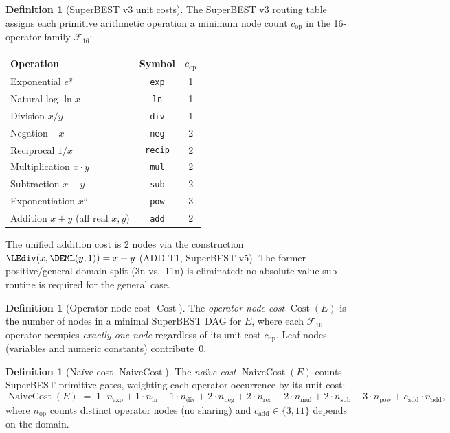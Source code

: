 \documentclass[12pt,a4paper]{article}
\theoremstyle{definition}
\newtheorem{definition}[theorem]{Definition}
\newcommand{\Cost}{\operatorname{Cost}}
\newcommand{\NC}{\operatorname{NaiveCost}}
\begin{document}
\begin{definition}[SuperBEST v3 unit costs]
\label{def:unit-costs}
The SuperBEST v3 routing table assigns each primitive arithmetic operation a
minimum node count $c_{\mathrm{op}}$ in the 16-operator family
$\mathcal{F}_{16}$:
\begin{center}
\begin{tabular}{@{}lcc@{}}
\toprule
\textbf{Operation} & \textbf{Symbol} & $c_{\mathrm{op}}$ \\
\midrule
Exponential $e^x$              & \texttt{exp}   & 1 \\
Natural log $\ln x$            & \texttt{ln}    & 1 \\
Division $x/y$                 & \texttt{div}   & 1 \\
Negation $-x$                  & \texttt{neg}   & 2 \\
Reciprocal $1/x$               & \texttt{recip} & 2 \\
Multiplication $x \cdot y$     & \texttt{mul}   & 2 \\
Subtraction $x - y$            & \texttt{sub}   & 2 \\
Exponentiation $x^n$           & \texttt{pow}   & 3 \\
Addition $x + y$ (all real $x,y$)  & \texttt{add} & 2 \\
\bottomrule
\end{tabular}
\end{center}
The unified addition cost is 2 nodes via the construction
$\LEdiv(x,\DEML(y,1)) = x + y$ (ADD-T1, SuperBEST v5).
The former positive/general domain split (3n vs.\ 11n) is eliminated:
no absolute-value sub-routine is required for the general case.
\end{definition}

\begin{definition}[Operator-node cost $\Cost$]
\label{def:Cost}
The \emph{operator-node cost} $\Cost(E)$ is the number of nodes in a minimal
SuperBEST DAG for $E$, where each $\mathcal{F}_{16}$ operator occupies
\emph{exactly one node} regardless of its unit cost $c_{\mathrm{op}}$.  Leaf
nodes (variables and numeric constants) contribute~0.
\end{definition}

\begin{definition}[Na\"{i}ve cost $\NC$]
\label{def:NC}
The \emph{na\"{i}ve cost} $\NC(E)$ counts SuperBEST primitive gates, weighting
each operator occurrence by its unit cost:
\[
  \NC(E)
  \;=\;
    1 \cdot n_{\exp}
  + 1 \cdot n_{\ln}
  + 1 \cdot n_{\mathrm{div}}
  + 2 \cdot n_{\mathrm{neg}}
  + 2 \cdot n_{\mathrm{rec}}
  + 2 \cdot n_{\mathrm{mul}}
  + 2 \cdot n_{\mathrm{sub}}
  + 3 \cdot n_{\mathrm{pow}}
  + c_{\mathrm{add}} \cdot n_{\mathrm{add}},
\]
where $n_{\mathrm{op}}$ counts distinct operator nodes (no sharing) and
$c_{\mathrm{add}} \in \{3, 11\}$ depends on the domain.
\end{definition}
\end{document}
